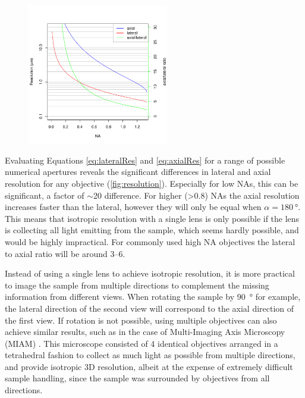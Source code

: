   \begin{figure}
    \centering
    \includegraphics[width=0.55\textwidth]{resolution}
    \label{fig:resolution}
  \end{figure}

  Evaluating Equations \ref{eq:lateralRes} and \ref{eq:axialRes} for a range of possible numerical apertures reveals the significant differences in lateral and axial resolution for any objective (\autoref{fig:resolution}). Especially for low NAs, this can be significant, a factor of $\sim$20 difference. For higher (>0.8) NAs the axial resolution increases faster than the lateral, however they will only be equal when $\alpha=\SI{180}{\degree}$. This means that isotropic resolution with a single lens is only possible if the lens is collecting all light emitting from the sample, which seems hardly possible, and would be highly impractical. For commonly used high NA objectives the lateral to axial ratio will be around 3--6. 

  Instead of using a single lens to achieve isotropic resolution, it is more practical to image the sample from multiple directions to complement the missing information from different views. When rotating the sample by \SI{90}{\degree} for example, the lateral direction of the second view will correspond to the axial direction of the first view. If rotation is not possible, using multiple objectives can also achieve similar results, such as in the case of Multi-Imaging Axis Microscopy (MIAM) \cite{swoger_multiple_2003,swoger_multi-view_2007}. This microscope consisted of 4 identical objectives arranged in a tetrahedral fashion to collect as much light as possible from multiple directions, and provide isotropic 3D resolution, albeit at the expense of extremely difficult sample handling, since the sample was surrounded by objectives from all directions. 

